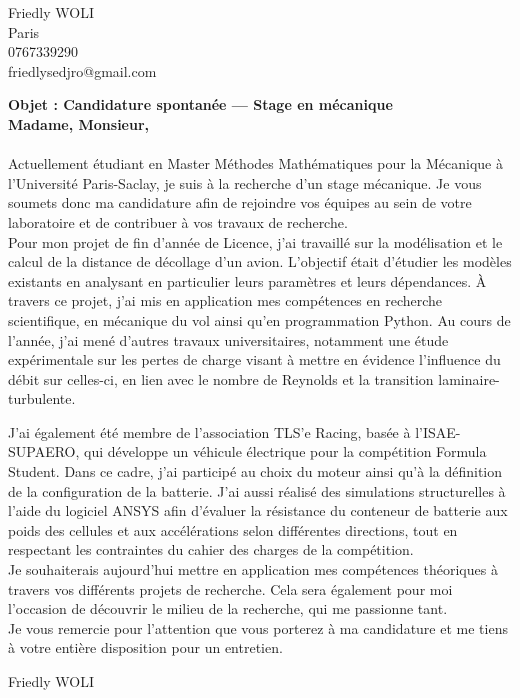 \documentclass[11pt,a4paper]{article}
\begin{document}
	\pagestyle{empty}
	
	\noindent
	Friedly WOLI \\
	Paris \\
	0767339290 \\
	friedlysedjro@gmail.com \\
	
	\bigskip
	
	\textbf{Objet : Candidature spontanée — Stage en mécanique} \\
	
	\textbf{Madame, Monsieur,} \\ \\ %
			
		Actuellement étudiant en Master Méthodes Mathématiques pour la Mécanique à l'Université Paris-Saclay, je suis à la recherche d'un stage mécanique. Je vous soumets donc ma candidature afin de rejoindre vos équipes au sein de votre laboratoire et de contribuer à vos travaux de recherche.\\
		
		Pour mon projet de fin d'année de Licence, j'ai travaillé sur la modélisation et le calcul de la distance de décollage d'un avion. L'objectif était d'étudier les modèles existants en analysant en particulier leurs paramètres et leurs dépendances. À travers ce projet, j'ai mis en application mes compétences en recherche scientifique, en mécanique du vol ainsi qu'en programmation Python.
		Au cours de l'année, j'ai mené d'autres travaux universitaires, notamment une étude expérimentale sur les pertes de charge visant à mettre en évidence l'influence du débit sur celles-ci, en lien avec le nombre de Reynolds et la transition laminaire-turbulente.
		
		J'ai également été membre de l’association TLS'e Racing, basée à l’ISAE-SUPAERO, qui développe un véhicule électrique pour la compétition Formula Student. Dans ce cadre, j’ai participé au choix du moteur ainsi qu’à la définition de la configuration de la batterie. J’ai aussi réalisé des simulations structurelles à l’aide du logiciel ANSYS afin d’évaluer la résistance du conteneur de batterie aux poids des cellules et aux accélérations selon différentes directions, tout en respectant les contraintes du cahier des charges de la compétition.\\
		
		Je souhaiterais aujourd’hui mettre en application mes compétences théoriques à travers vos différents projets de recherche. Cela sera également pour moi l'occasion de découvrir le milieu de la recherche, qui me passionne tant.\\
		
		Je vous remercie pour l'attention que vous porterez à ma candidature et me tiens à votre entière disposition pour un entretien.

	
	\vspace{0.8cm}
	
	\begin{flushright}
		Friedly WOLI
	\end{flushright}
	
\end{document}
